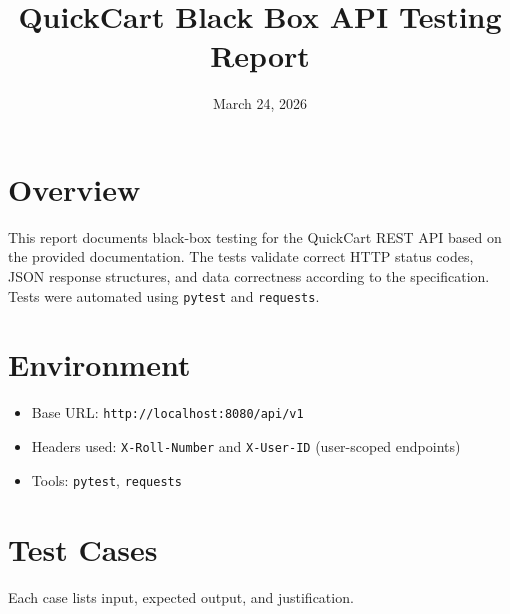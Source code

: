\documentclass[11pt]{article}
\title{QuickCart Black Box API Testing Report}
\author{ }
\date{March 24, 2026}
\begin{document}
\maketitle

\section*{Overview}
This report documents black-box testing for the QuickCart REST API based on the provided documentation. The tests validate correct HTTP status codes, JSON response structures, and data correctness according to the specification. Tests were automated using \texttt{pytest} and \texttt{requests}.

\section*{Environment}
\begin{itemize}[leftmargin=*]
  \item Base URL: \texttt{http://localhost:8080/api/v1}
  \item Headers used: \texttt{X-Roll-Number} and \texttt{X-User-ID} (user-scoped endpoints)
  \item Tools: \texttt{pytest}, \texttt{requests}
\end{itemize}

\section*{Test Cases}
Each case lists input, expected output, and justification.
\end{document}

